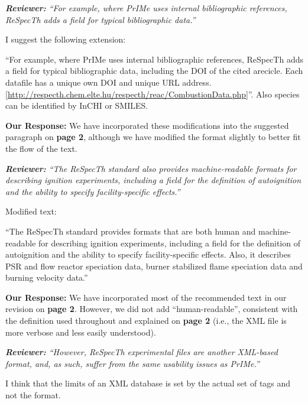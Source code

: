 \documentclass[a4paper,10pt]{elsarticle}
\newenvironment{reviewer}{\vspace{0.5\baselineskip}\begingroup\itshape\textbf{Reviewer:}}{\endgroup}
\newenvironment{response}{\textbf{Our Response:}}{\vspace{0.5\baselineskip}}
\begin{document}
\begin{reviewer}
    ``For example, where PrIMe uses internal bibliographic references, ReSpecTh adds a field for
    typical bibliographic data.''

    I suggest the following extension:

    ``For example, where PrIMe uses internal bibliographic references, ReSpecTh adds a field for
    typical bibliographic data, including the DOI of the cited arecicle. Each datafile has a unique
    own DOI and unique URL address.
    [\url{http://respecth.chem.elte.hu/respecth/reac/CombustionData.php}]''. Also species can be
    identified by InCHI or SMILES.
\end{reviewer}

\begin{response}
    We have incorporated these modifications into the suggested paragraph on \textbf{page 2},
    although we have modified the format slightly to better fit the flow of the text.
\end{response}

\begin{reviewer}
    ``The ReSpecTh standard also provides machine-readable formats for describing ignition
    experiments, including a field for the definition of autoignition and the ability to specify
    facility-specific effects.''

    Modified text:

    ``The ReSpecTh standard provides formats that are both human and machine-readable for describing
    ignition experiments, including a field for the definition of autoignition and the ability to
    specify facility-specific effects. Also, it describes PSR and flow reactor speciation data,
    burner stabilized flame speciation data and burning velocity data.''
\end{reviewer}

\begin{response}
    We have incorporated most of the recommended text in our revision on \textbf{page 2}.
    However, we did not add ``human-readable'', consistent with the definition used throughout
    and explained on \textbf{page 2} (i.e., the XML file is more verbose and less easily understood).
\end{response}

\begin{reviewer}
    ``However, ReSpecTh experimental files are another XML-based format, and, as such, suffer from
    the same usability issues as PrIMe.''

    I think that the limits of an XML database is set by the actual set of tags and not the format.
\end{reviewer}
\end{document}
